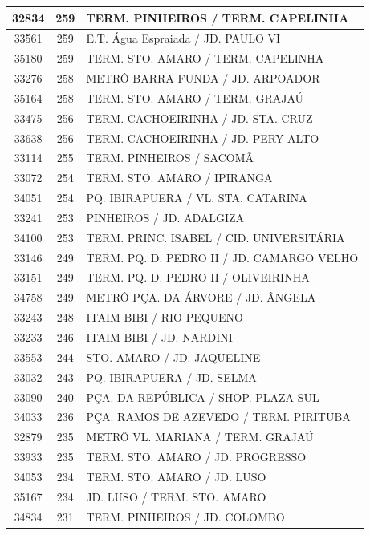 \documentclass[
	12pt,				%
	oneside,			%
	a4paper,			%
	english,			%
	brazil				%
	]{abntex2ppgsi}
\begin{document}
\begin{apendicesenv}
\begin{longtable}{c|c|p{7cm}}
\hline
    32834 & 259   & TERM. PINHEIROS / TERM. CAPELINHA \\
\hline
    33561 & 259   & E.T. Água Espraiada / JD. PAULO VI \\
\hline
    35180 & 259   & TERM. STO. AMARO / TERM. CAPELINHA \\
\hline
    33276 & 258   & METRÔ BARRA FUNDA / JD. ARPOADOR \\
\hline
    35164 & 258   & TERM. STO. AMARO / TERM. GRAJAÚ \\
\hline
    33475 & 256   & TERM. CACHOEIRINHA / JD. STA. CRUZ \\
\hline
    33638 & 256   & TERM. CACHOEIRINHA / JD. PERY ALTO \\
\hline
    33114 & 255   & TERM. PINHEIROS / SACOMÃ \\
\hline
    33072 & 254   & TERM. STO. AMARO / IPIRANGA \\
\hline
    34051 & 254   & PQ. IBIRAPUERA / VL. STA. CATARINA \\
\hline
    33241 & 253   & PINHEIROS / JD. ADALGIZA \\
\hline
    34100 & 253   & TERM. PRINC. ISABEL / CID. UNIVERSITÁRIA \\
\hline
    33146 & 249   & TERM. PQ. D. PEDRO II / JD. CAMARGO VELHO \\
\hline
    33151 & 249   & TERM. PQ. D. PEDRO II / OLIVEIRINHA \\
\hline
    34758 & 249   & METRÔ PÇA. DA ÁRVORE / JD. ÂNGELA \\
\hline
    33243 & 248   & ITAIM BIBI / RIO PEQUENO \\
\hline
    33233 & 246   & ITAIM BIBI / JD. NARDINI \\
\hline
    33553 & 244   & STO. AMARO / JD. JAQUELINE \\
\hline
    33032 & 243   & PQ. IBIRAPUERA / JD. SELMA \\
\hline
    33090 & 240   & PÇA. DA REPÚBLICA / SHOP. PLAZA SUL \\
\hline
    34033 & 236   & PÇA. RAMOS DE AZEVEDO / TERM. PIRITUBA \\
\hline
    32879 & 235   & METRÔ VL. MARIANA / TERM. GRAJAÚ \\
\hline
    33933 & 235   & TERM. STO. AMARO / JD. PROGRESSO \\
\hline
    34053 & 234   & TERM. STO. AMARO / JD. LUSO \\
\hline
    35167 & 234   & JD. LUSO / TERM. STO. AMARO \\
\hline
    34834 & 231   & TERM. PINHEIROS / JD. COLOMBO \\

\end{longtable}
\end{apendicesenv}
\end{document}
